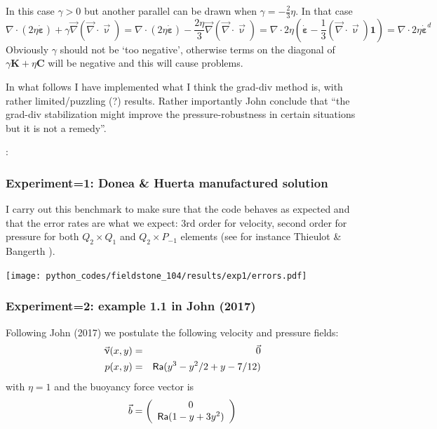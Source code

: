 In this case $\gamma>0$ but another parallel can be drawn when $\gamma = -\frac{2}{3}\eta$. In that case
\[
 \nabla \cdot ( 2 \eta \dot{\bm \varepsilon}) + \gamma \vec\nabla (\vec\nabla\cdot \vec\upnu)
=
 \nabla \cdot ( 2 \eta \dot{\bm \varepsilon}) -\frac{2\eta}{3} \vec\nabla (\vec\nabla\cdot \vec\upnu)
=
 \nabla \cdot 2 \eta ( \dot{\bm \varepsilon} -\frac{1}{3} (\vec\nabla\cdot \vec\upnu) {\bm 1} )
= 
 \nabla \cdot 2 \eta \dot{\bm \varepsilon}^d 
\]
Obviously $\gamma$ should not be `too negative', otherwise terms on the diagonal 
of $\gamma {\bm K} + \eta {\bm C} $
will be negative and this will cause problems. 

In what follows I have implemented what I think the grad-div method is, with 
rather limited/puzzling (?) results.
Rather importantly John \etal conclude that ``the
grad-div stabilization might improve the pressure-robustness in certain situations but
it is not a remedy''. 

\Literature: \cite{ollh09}

\subsubsection*{Experiment=1: Donea \& Huerta manufactured solution}

I carry out this benchmark to make sure that the code behaves as expected and that the
error rates are what we expect: 3rd order for velocity, second order for pressure 
for both $Q_2\times Q_1$ and $Q_2\times P_{-1}$ elements (see for instance 
Thieulot \& Bangerth \cite{thba22}).

\begin{center}
\texttt{[image: python\_codes/fieldstone\_104/results/exp1/errors.pdf]}
\end{center}


\subsubsection*{Experiment=2: example 1.1 in John \etal (2017)}
Following John \etal (2017) \cite{jolm17} we 
postulate the following velocity and pressure fields:
\begin{eqnarray}
\vec{\upnu}(x,y) &=& \vec{0} \nonumber\\
p(x,y) &=& {\mathsf{Ra}} ( y^3-y^2/2+y-7/12 ) \nonumber
\end{eqnarray}
with $\eta=1$ and the buoyancy force vector is
\[
\vec{b}=
\left(
\begin{array}{c}
0 \\ {\mathsf{Ra}}(1-y+3y^2)
\end{array}
\right)
\]

